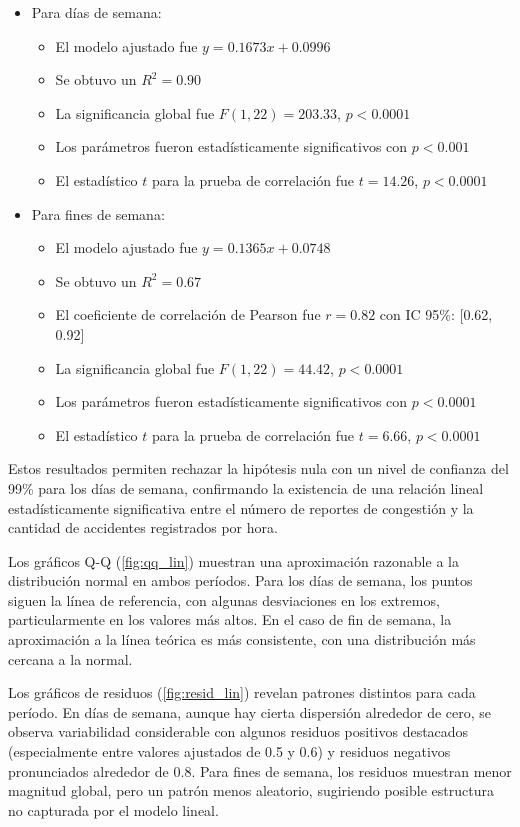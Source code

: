 \documentclass[12pt]{article}
\begin{document}
\begin{itemize}
    \item Para días de semana:
    \begin{itemize}
        \item El modelo ajustado fue $y = 0.1673x + 0.0996$
        \item Se obtuvo un $R^2 = 0.90$
        \item La significancia global fue $F(1, 22) = 203.33$, $p < 0.0001$
        \item Los parámetros fueron estadísticamente significativos con $p < 0.001$
        \item El estadístico $t$ para la prueba de correlación fue $t = 14.26$, $p < 0.0001$
    \end{itemize}

    \item Para fines de semana:
    \begin{itemize}
        \item El modelo ajustado fue $y = 0.1365x + 0.0748$
        \item Se obtuvo un $R^2 = 0.67$
        \item El coeficiente de correlación de Pearson fue $r = 0.82$ con IC 95\%: [0.62, 0.92]
        \item La significancia global fue $F(1, 22) = 44.42$, $p < 0.0001$
        \item Los parámetros fueron estadísticamente significativos con $p < 0.0001$
        \item El estadístico $t$ para la prueba de correlación fue $t = 6.66$, $p < 0.0001$
    \end{itemize}
\end{itemize}

Estos resultados permiten rechazar la hipótesis nula con un nivel de confianza del 99\% para los días de semana, confirmando la existencia de una relación lineal estadísticamente significativa entre el número de reportes de congestión y la cantidad de accidentes registrados por hora.

Los gráficos Q-Q (\cref{fig:qq_lin}) muestran una aproximación razonable a la distribución normal en ambos períodos. Para los días de semana, los puntos siguen la línea de referencia, con algunas desviaciones en los extremos, particularmente en los valores más altos. En el caso de fin de semana, la aproximación a la línea teórica es más consistente, con una distribución más cercana a la normal.

Los gráficos de residuos (\cref{fig:resid_lin}) revelan patrones distintos para cada período. En días de semana, aunque hay cierta dispersión alrededor de cero, se observa variabilidad considerable con algunos residuos positivos destacados (especialmente entre valores ajustados de 0.5 y 0.6) y residuos negativos pronunciados alrededor de 0.8. Para fines de semana, los residuos muestran menor magnitud global, pero un patrón menos aleatorio, sugiriendo posible estructura no capturada por el modelo lineal.
\end{document}
